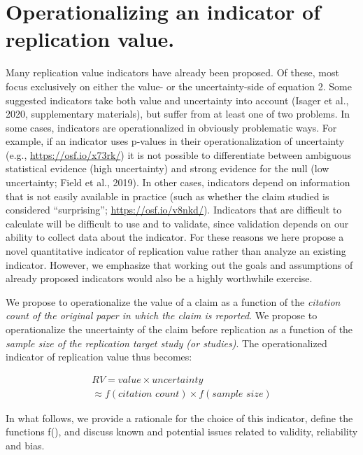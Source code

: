 \documentclass[
  english,
  jou,floatsintext]{apa6}
\begin{document}
\hypertarget{operationalizing-an-indicator-of-replication-value.}{%
\section{Operationalizing an indicator of replication value.}\label{operationalizing-an-indicator-of-replication-value.}}

Many replication value indicators have already been proposed. Of these, most focus exclusively on either the value- or the uncertainty-side of equation 2. Some suggested indicators take both value and uncertainty into account (Isager et al., 2020, supplementary materials), but suffer from at least one of two problems. In some cases, indicators are operationalized in obviously problematic ways. For example, if an indicator uses p-values in their operationalization of uncertainty (e.g., \url{https://osf.io/x73rk/}) it is not possible to differentiate between ambiguous statistical evidence (high uncertainty) and strong evidence for the null (low uncertainty; Field et al., 2019). In other cases, indicators depend on information that is not easily available in practice (such as whether the claim studied is considered ``surprising''; \url{https://osf.io/v8nkd/}). Indicators that are difficult to calculate will be difficult to use and to validate, since validation depends on our ability to collect data about the indicator. For these reasons we here propose a novel quantitative indicator of replication value rather than analyze an existing indicator. However, we emphasize that working out the goals and assumptions of already proposed indicators would also be a highly worthwhile exercise.

We propose to operationalize the value of a claim as a function of the \emph{citation count of the original paper in which the claim is reported}. We propose to operationalize the uncertainty of the claim before replication as a function of the \emph{sample size of the replication target study (or studies)}. The operationalized indicator of replication value thus becomes:

\begin{equation} 
  \tag{3}
  \begin{split} 
  RV=value\times uncertainty \\
  \approx f(\textit{citation count}) \times f(\textit{sample size})
  \end{split}
  \label{eq:3}
\end{equation}

In what follows, we provide a rationale for the choice of this indicator, define the functions f(), and discuss known and potential issues related to validity, reliability and bias.
\end{document}
